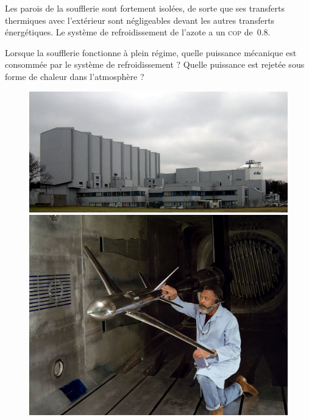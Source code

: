 	Les parois de la soufflerie sont fortement isolées, de sorte que ses transferts thermiques avec l’extérieur sont négligeables devant les autres transferts énergétiques. Le système de refroidissement de l’azote a un \textsc{cop} de~\num{0,8}. 
	
	Lorsque la soufflerie fonctionne à plein régime, quelle puissance mécanique est consommée par le système de refroidissement ? Quelle puissance est rejetée sous forme de chaleur dans l’atmosphère ?

	\begin{figure}[htp]
		\begin{center}
			\includegraphics[width=0.8\columnwidth]{images/etw.jpg}
			\includegraphics[width=0.8\columnwidth]{images/langley_transonic.jpg}
		\end{center}
		\label{fig_souffleries}
	\end{figure}

